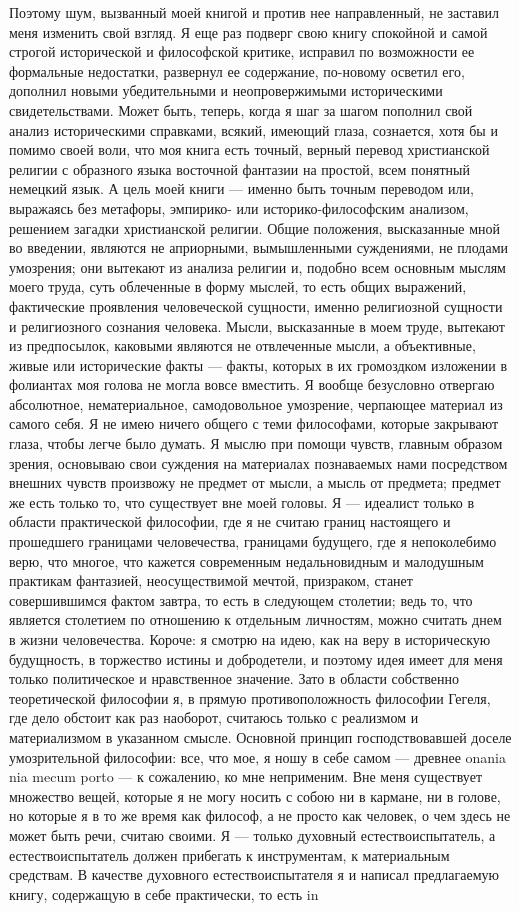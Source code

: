 \documentclass[12pt,oneside]{book}
\begin{document}
Поэтому шум, вызванный моей книгой и против нее направленный, не заставил меня изменить свой взгляд. Я еще раз подверг свою книгу спокойной и самой строгой исторической и философской критике, исправил по возможности ее формальные недостатки, развернул ее содержание, по-новому осветил его, дополнил новыми убедительными и неопровержимыми историческими свидетельствами. Может быть, теперь, когда я шаг за шагом пополнил свой анализ историческими справками, всякий, имеющий глаза, сознается, хотя бы и помимо своей воли, что моя книга есть точный, верный перевод христианской религии с образного языка восточной фантазии на простой, всем понятный немецкий язык. А цель моей книги --- именно быть точным переводом или, выражаясь без метафоры, эмпирико- или историко-философским анализом, решением загадки христианской религии. Общие положения, высказанные мной во введении, являются не априорными, вымышленными суждениями, не плодами умозрения; они вытекают из анализа религии и, подобно всем основным мыслям моего труда, суть облеченные в форму мыслей, то есть общих выражений, фактические проявления человеческой сущности, именно религиозной сущности и религиозного сознания человека. Мысли, высказанные в моем труде, вытекают из предпосылок, каковыми являются не отвлеченные мысли, а объективные, живые или исторические факты --- факты, которых в их громоздком изложении в фолиантах моя голова не могла вовсе вместить. Я вообще безусловно отвергаю абсолютное, нематериальное, самодовольное умозрение, черпающее материал из самого себя. Я не имею ничего общего с теми философами, которые закрывают глаза, чтобы легче было думать. Я мыслю при помощи чувств, главным образом зрения, основываю свои суждения на материалах познаваемых нами посредством внешних чувств произвожу не предмет от мысли, а мысль от предмета; предмет же есть только то, что существует вне моей головы. Я --- идеалист только в области практической философии, где я не считаю границ настоящего и прошедшего границами человечества, границами будущего, где я непоколебимо верю, что многое, что кажется современным недальновидным и малодушным практикам фантазией, неосуществимой мечтой, призраком, станет совершившимся фактом завтра, то есть в следующем столетии; ведь то, что является столетием по отношению к отдельным личностям, можно считать днем в жизни человечества. Короче: я смотрю на идею, как на веру в историческую будущность, в торжество истины и добродетели, и поэтому идея имеет для меня только политическое и нравственное значение. Зато в области собственно теоретической философии я, в прямую противоположность философии Гегеля, где дело обстоит как раз наоборот, считаюсь только с реализмом и материализмом в указанном смысле. Основной принцип господствовавшей доселе умозрительной философии: все, что мое, я ношу в себе самом --- древнее onania nia mecum porto --- к сожалению, ко мне неприменим. Вне меня существует множество вещей, которые я не могу носить с собою ни в кармане, ни в голове, но которые я в то же время как философ, а не просто как человек, о чем здесь не может быть речи, считаю своими. Я --- только духовный естествоиспытатель, а естествоиспытатель должен прибегать к инструментам, к материальным средствам. В качестве духовного естествоиспытателя я и написал предлагаемую книгу, содержащую в себе практически, то есть in 
\end{document}
